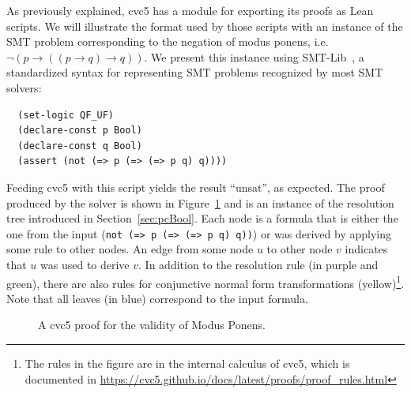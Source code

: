 As previously explained, cvc5 has a module for exporting its proofs as Lean scripts.
We will illustrate the format used by those scripts with an instance of the SMT problem corresponding
to the negation of modus ponens, i.e. $\neg (p \rightarrow ((p \rightarrow q) \rightarrow q))$.
We present this instance using SMT-Lib~\cite{smtlib}, a standardized syntax for
representing SMT problems recognized by most SMT solvers:

\begin{verbatim}
  (set-logic QF_UF)
  (declare-const p Bool)
  (declare-const q Bool)
  (assert (not (=> p (=> (=> p q) q))))
\end{verbatim}

Feeding cvc5 with this script yields the result ``unsat'', as expected. The proof produced by the solver is shown in Figure~\ref{fig:cvc5-proof} and is an instance of the resolution tree introduced in Section~\ref{sec:pcBool}.
Each node is a formula that is either the one from the input (\texttt{not (=> p (=> (=> p q) q))}) or was derived by applying some
rule to other nodes. An edge from some node $u$ to other node $v$ indicates that
$u$ was used to derive $v$.
In addition to the resolution rule (in purple and green), there are also rules for conjunctive normal form transformations (yellow)\footnote{The rules in the figure are in the internal calculus of cvc5, which is documented in \url{https://cvc5.github.io/docs/latest/proofs/proof_rules.html}}. Note that all leaves (in blue) correspond to the input formula.

\makeatletter
\setlength{\@fptop}{0pt}
\makeatother

\begin{figure}[t!]
  \centering
  \caption{A cvc5 proof for the validity of Modus Ponens.}
  \label{fig:cvc5-proof}
\end{figure}

